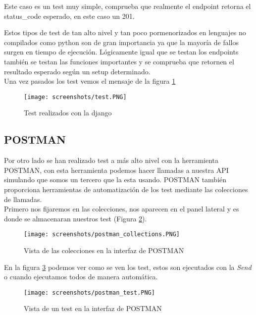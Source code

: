 Este caso es un test muy simple, comprueba que realmente el endpoint retorna el status\_code esperado, en este caso un 201.

Estos tipos de test de tan alto nivel y tan poco pormenorizados en lenguajes no compilados como python son de gran importancia ya que la mayoría de fallos surgen en tiempo de ejecución. Lógicamente igual que se testan los endpoints también se testan las funciones importantes y se comprueba que retornen el resultado esperado según un setup determinado.\\
Una vez pasados los test vemos el mensaje de la figura \ref{fig:test}
\begin{figure}[ht!]
\center
\texttt{[image: screenshots/test.PNG]}
\caption{Test realizados con la django}
\label{fig:test}
\end{figure}
\newpage
\subsection{POSTMAN}
Por otro lado se han realizado test a más alto nivel con la herramienta POSTMAN, con esta herramienta podemos hacer llamadas a nuestra API simulando que somos un tercero que la esta usando. POSTMAN también proporciona herramientas de automatización de los test mediante las colecciones de llamadas.\\
Primero nos fijaremos en las colecciones, nos aparecen en el panel lateral y es donde se almacenaran nuestros test (Figura \ref{fig:postman_coll}). 
\begin{figure}[ht!]
\center
\texttt{[image: screenshots/postman\_collections.PNG]}
\caption{Vista de las colecciones en la interfaz de POSTMAN}
\label{fig:postman_coll}
\end{figure}
\newpage
En la figura \ref{fig:postman_test} podemos ver como se ven los test, estos son ejecutados con la \textit{Send} o cuando ejecutamos todos de manera automática.
\begin{figure}[ht!]
\center
\texttt{[image: screenshots/postman\_test.PNG]}
\caption{Vista de un test en la interfaz de POSTMAN}
\label{fig:postman_test}
\end{figure}

